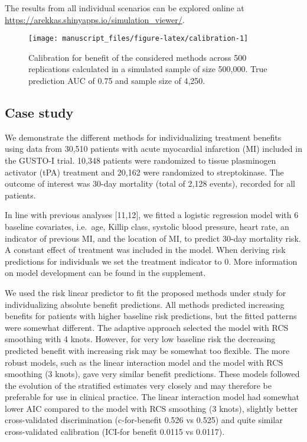 \documentclass[]{elsarticle} %
\begin{document}
The results from all individual scenarios can be explored online at
\url{https://arekkas.shinyapps.io/simulation_viewer/}.

\begin{figure}
\texttt{[image: manuscript\_files/figure-latex/calibration-1]} \caption{Calibration for benefit of the considered methods across 500 replications calculated in a simulated sample of size 500,000. True prediction AUC of 0.75 and sample size of 4,250.}\label{fig:calibration}
\end{figure}

\hypertarget{case-study}{%
\subsection{Case study}\label{case-study}}

We demonstrate the different methods for individualizing treatment
benefits using data from 30,510 patients with acute myocardial
infarction (MI) included in the GUSTO-I trial. 10,348 patients were
randomized to tissue plasminogen activator (tPA) treatment and 20,162
were randomized to streptokinase. The outcome of interest was 30-day
mortality (total of 2,128 events), recorded for all patients.

In line with previous analyses {[}11,12{]}, we fitted a logistic
regression model with 6 baseline covariates, i.e.~age, Killip class,
systolic blood pressure, heart rate, an indicator of previous MI, and
the location of MI, to predict 30-day mortality risk. A constant effect
of treatment was included in the model. When deriving risk predictions
for individuals we set the treatment indicator to 0. More information on
model development can be found in the supplement.

We used the risk linear predictor to fit the proposed methods under
study for individualizing absolute benefit predictions. All methods
predicted increasing benefits for patients with higher baseline risk
predictions, but the fitted patterns were somewhat different. The
adaptive approach selected the model with RCS smoothing with 4 knots.
However, for very low baseline risk the decreasing predicted benefit
with increasing risk may be somewhat too flexible. The more robust
models, such as the linear interaction model and the model with RCS
smoothing (3 knots), gave very similar benefit predictions. These models
followed the evolution of the stratified estimates very closely and may
therefore be preferable for use in clinical practice. The linear
interaction model had somewhat lower AIC compared to the model with RCS
smoothing (3 knots), slightly better cross-validated discrimination
(c-for-benefit 0.526 vs 0.525) and quite similar cross-validated
calibration (ICI-for benefit 0.0115 vs 0.0117).
\end{document}
